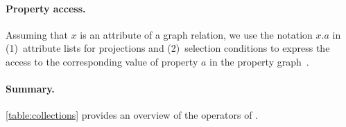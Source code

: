 \paragraph{Property access.} Assuming that $x$ is an attribute of a graph relation, we use the notation $x.a$ in (1)~attribute lists for projections and (2)~selection conditions to express the access to the corresponding value of property $a$ in the property graph~\cite{DBLP:conf/edbt/HolschG16}.

\paragraph{Summary.} \autoref{table:collections} provides an overview of the operators of \rga.

\newcommand{\propheader}{\multirow{2}{*}{\bf prop.}}
\newcommand{\rgaheader}{\multirow{2}{*}{\breakable{\bf RGA}}}

